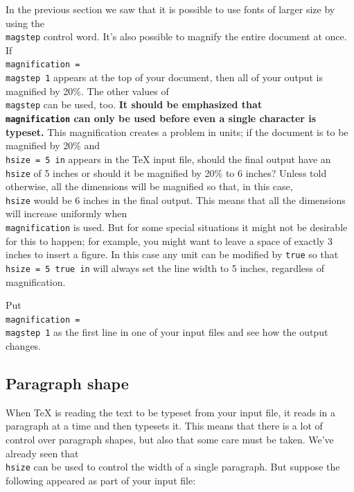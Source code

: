 In the previous section we saw that it is possible to use fonts 
of larger size by using the {\tt \\magstep} control word.  It's 
also possible to magnify the entire document at once. If {\tt 
\\magnification = \\magstep 1} appears at the top of your document, 
then all of your output is magnified by 20\%\null.  The other 
values of {\tt \\magstep} can be used, too. {\bf It should be 
emphasized that {\tt \\magnification} can only be used before 
even a single character is typeset.}  This magnification creates 
a problem in units; if the document is to be magnified by 20\% 
and {\tt \\hsize = 5 in} appears in the \TeX{} input file, should 
the final output have an {\tt \\hsize} of 5 inches or should it 
be magnified by 20\% to 6 inches? Unless told otherwise, all the 
dimensions will be magnified so that, in this case, {\tt \\hsize} 
would be 6 inches in the final output.  This means that all the 
dimensions will increase uniformly when {\tt \\magnification} is 
used.  But for some special situations it might not be desirable 
for this to happen; for example, you might want to leave a space 
of exactly 3 inches to insert a figure.  In this case any unit 
can be modified by {\tt true} so that {\tt \\hsize = 5 true in} 
will always set the line width to 5 inches, regardless of 
magnification.   

\exercise Put {\tt \\magnification = \\magstep 1} as the first 
line in one of your input files and see how the output changes. 

\subsection{Paragraph shape} 

When \TeX{} is reading the text to be typeset from your input 
file, it reads in a paragraph at a time and then typesets it. 
This means that there is a lot of control over paragraph shapes, 
but also that some care must be taken.  We've already seen that 
{\tt \\hsize} can be used to control the width of a single 
paragraph.  But suppose the following appeared as part of your 
input file: 

